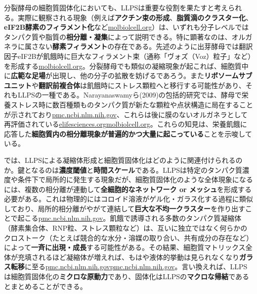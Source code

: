 分裂酵母の細胞質固体化においても、LLPSは重要な役割を果たすと考えられる。実際に観察される現象（例えば\textbf{アクチン束の形成}、\textbf{脂質滴のクラスター化}、\textbf{eIF2B酵素のフィラメント化}など\href{https://www.molbiolcell.org/doi/10.1091/mbc.E20-02-0125\#:~:text=induces\%20a\%20massive\%20reorganization\%20of,a\%20\%E2\%80\%9Csolidification\%E2\%80\%9D\%20of\%20the\%20cytoplasm}{molbiolcell.org}）は、いずれも分子レベルではタンパク質や脂質の\textbf{相分離・凝集}によって説明できる。特に顕著なのは、オルガネラに属さない\textbf{酵素フィラメント}の存在である。先述のように出芽酵母では翻訳因子eIF2Bが飢餓時に巨大なフィラメント束（通称「ヴォズ（Voz）粒子」など）を形成する\href{https://www.molbiolcell.org/doi/10.1091/mbc.E20-02-0125\#:~:text=induces\%20a\%20massive\%20reorganization\%20of,protective\%20mechanism\%20for\%20molecular\%20components}{molbiolcell.org}。分裂酵母でも類似の凝縮現象が起これば、細胞質中に\textbf{広範な足場}が出現し、他の分子の拡散を妨げるであろう。また\textbf{リボソームサブユニット}や\textbf{翻訳前複合体}は飢餓時にストレス顆粒へと移行する可能性があり、それもLLPSの一種である。Narayanaswamyら(2009)の包括的研究では、酵母で栄養ストレス時に数百種類ものタンパク質が新たな顆粒や点状構造に局在することが示されており\href{https://pmc.ncbi.nlm.nih.gov/articles/PMC6857596/\#:~:text=shown\%20to\%20introduce\%20structural\%20changes,2016}{pmc.ncbi.nlm.nih.gov}、これらは後に膜のないオルガネラとして再評価されている\href{https://elifesciences.org/articles/02409\#:~:text=Filament\%20formation\%20by\%20metabolic\%20enzymes,Gln1\%20has}{elifesciences.org}\href{https://www.molbiolcell.org/doi/10.1091/mbc.E20-02-0125\#:~:text=Reorganization\%20of\%20budding\%20yeast\%20cytoplasm,de\%20novo\%20formation\%20of}{molbiolcell.org}。これらの知見は、栄養飢餓に応答した\textbf{細胞質内の相分離現象が普遍的かつ大量に起こっている}ことを示唆している。

では、LLPSによる凝縮体形成と細胞質固体化はどのように関連付けられるのか。鍵となるのは\textbf{濃度閾値}と\textbf{時間スケール}である。LLPSは特定のタンパク質濃度や条件下で局所的に発生する現象だが、細胞質固体化のような全体現象になるには、複数の相分離が連動して\textbf{全細胞的なネットワーク or メッシュ}を形成する必要がある。これは物理的にはコロイド溶液がゲル化・ガラス化する過程に類似しており、局所的相分離がやがて連結して\textbf{巨大な不均一クラスター}を作り出すことで起こる\href{https://pmc.ncbi.nlm.nih.gov/articles/PMC4850707/\#:~:text=match\%20at\%20L1536\%20agreement\%20with,have\%20to\%20determine\%20the\%20molecular}{pmc.ncbi.nlm.nih.gov}。飢餓で誘導される多数のタンパク質凝縮体（酵素集合体、RNP粒、ストレス顆粒など）は、互いに独立ではなく何らかのクロストーク（たとえば競合的な水分・溶媒の取り合い、共有成分の存在など）によって\textbf{一斉に出現・成長}する可能性がある。その結果、細胞質マトリックス全体が充填されるほど凝縮体が増えれば、もはや液体的挙動は見られなくなり\textbf{ガラス転移}に至る\href{https://pmc.ncbi.nlm.nih.gov/articles/PMC6857596/\#:~:text=N\%C3\%B8rrelykke\%20et\%20al,to\%20environmental\%20changes\%20requires\%20a}{pmc.ncbi.nlm.nih.gov}\href{https://pmc.ncbi.nlm.nih.gov/articles/PMC6857596/\#:~:text=a\%20gel,N\%C3\%B8rrelykke\%20et}{pmc.ncbi.nlm.nih.gov}。言い換えれば、LLPSは細胞質固体化の\textbf{ミクロな原動力}であり、固体化はLLPSの\textbf{マクロな帰結}であるとまとめることができる。

